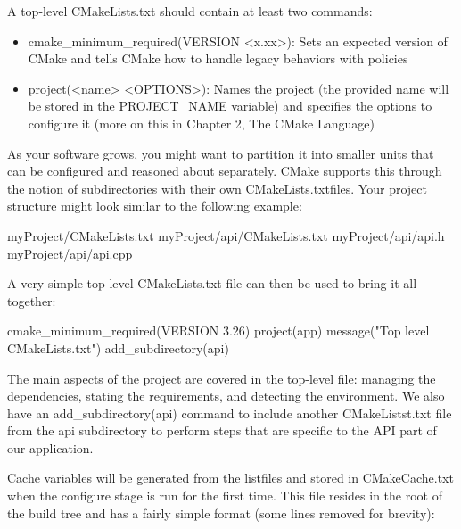 A top-level CMakeLists.txt should contain at least two commands:

\begin{itemize}
\item
cmake\_minimum\_required(VERSION <x.xx>): Sets an expected version of CMake and tells CMake how to handle legacy behaviors with policies

\item
project(<name> <OPTIONS>): Names the project (the provided name will be stored in the PROJECT\_NAME variable) and specifies the options to configure it (more on this in Chapter 2, The CMake Language)
\end{itemize}

As your software grows, you might want to partition it into smaller units that can be configured and reasoned about separately. CMake supports this through the notion of subdirectories with their own CMakeLists.txtfiles. Your project structure might look similar to the following example:

\begin{shell}
myProject/CMakeLists.txt
myProject/api/CMakeLists.txt
myProject/api/api.h
myProject/api/api.cpp
\end{shell}

A very simple top-level CMakeLists.txt file can then be used to bring it all together:

\begin{cmake}
cmake_minimum_required(VERSION 3.26)
project(app)
message("Top level CMakeLists.txt")
add_subdirectory(api)
\end{cmake}

The main aspects of the project are covered in the top-level file: managing the dependencies, stating the requirements, and detecting the environment. We also have an add\_subdirectory(api) command to include another CMakeListst.txt file from the api subdirectory to perform steps that are specific to the API part of our application.


Cache variables will be generated from the listfiles and stored in CMakeCache.txt when the configure stage is run for the first time. This file resides in the root of the build tree and has a fairly simple format (some lines removed for brevity):


